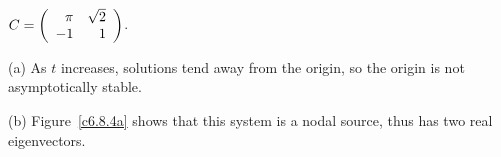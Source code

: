 \documentclass{ximera}
\begin{document}
\begin{computerExercise} \label{c6.8.4a}
$C=\left(\begin{array}{rr} \pi & \sqrt{2}\\ -1 &1\end{array}\right)$.

\begin{solution}

(a) As $t$ increases, solutions tend away from the origin, so the origin
is not asymptotically stable.

(b) Figure~\ref{c6.8.4a} shows that this system is a nodal source,
thus has two real eigenvectors.

\end{solution}
\end{computerExercise}
\end{document}

